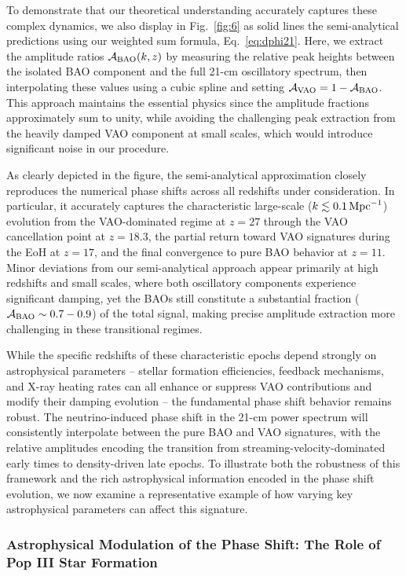 \documentclass[floats,floatfix,showpacs,amssymb,prd,twocolumn,superscriptaddress,nofootinbib,reprint,preprintnumbers]{revtex4-2}
\begin{document}
To demonstrate that our theoretical understanding accurately captures these complex dynamics, we also display in Fig.~\ref{fig:6} as solid lines the semi-analytical predictions using our weighted sum formula, Eq.~\eqref{eq:dphi21}. Here, we extract the amplitude ratios $\mathcal{A}_{\rm BAO}(k,z)$ by measuring the relative peak heights between the isolated BAO component and the full 21-cm oscillatory spectrum, then interpolating these values using a cubic spline and setting $\mathcal{A}_{\rm VAO} = 1 - \mathcal{A}_{\rm BAO}$. This approach maintains the essential physics since the amplitude fractions approximately sum to unity, while avoiding the challenging peak extraction from the heavily damped VAO component at small scales, which would introduce significant noise in our procedure.

As clearly depicted in the figure, the semi-analytical approximation closely reproduces the numerical phase shifts across all redshifts under consideration. In particular, it accurately captures the characteristic large-scale ($k\lesssim 0.1\,\rm{Mpc}^{-1}$) evolution from the VAO-dominated regime at $z=27$ through the VAO cancellation point at $z=18.3$, the partial return toward VAO signatures during the EoH at $z=17$, and the final convergence to pure BAO behavior at $z=11$. Minor deviations from our semi-analytical approach appear primarily at high redshifts and small scales, where both oscillatory components experience significant damping, yet the BAOs still constitute a substantial fraction ($\mathcal{A}_{\rm BAO} \sim 0.7-0.9$) of the total signal, making precise amplitude extraction more challenging in these transitional regimes.

While the specific redshifts of these characteristic epochs depend strongly on astrophysical parameters -- stellar formation efficiencies, feedback mechanisms, and X-ray heating rates can all enhance or suppress VAO contributions and modify their damping evolution -- the fundamental phase shift behavior remains robust. The neutrino-induced phase shift in the 21-cm power spectrum will consistently interpolate between the pure BAO and VAO signatures, with the relative amplitudes encoding the transition from streaming-velocity-dominated early times to density-driven late epochs. To illustrate both the robustness of this framework and the rich astrophysical information encoded in the phase shift evolution, we now examine a representative example of how varying key astrophysical parameters can affect this signature.

\subsubsection*{Astrophysical Modulation of the Phase Shift: The Role of Pop III Star Formation}
\label{sec:fstarIII}
\end{document}
